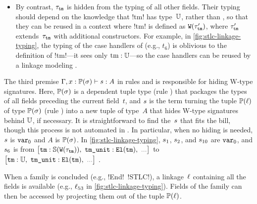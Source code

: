 \begin{itemize}
\item
By contrast, $\tau_{\texttt{tm}}$ is hidden from the typing of all other fields.
Their typing should depend on the knowledge that \lsti!tm! has type~$\mathbb{U}$,
rather than ,
so that they can be reused in a context where
\lsti!tm! is defined as $\texttt{W}({\tau'_{\texttt{tm}}})$,
where $\tau'_{\texttt{tm}}$ extends~$\tau_{\texttt{tm}}$ with additional constructors.
%
For example, in \cref{fig:stlc-linkage-typing}, the typing of the case handlers of
 (e.g., $t_6$) is oblivious to the definition of \lsti!tm!---it sees only $\text{\lsti!tm!}:\cU$---so
the case handlers can be reused by a linkage modeling .

\end{itemize}

The third premise
$ {\Gamma,x : \mathbb{P}({\sigma})} \vdash {\ensuremath{s}} : {A} $
in rules  and  is
responsible for hiding W-type signatures.
Here, $\mathbb{P}({\sigma})$ is a dependent tuple type (rule )
that packages the types of all fields preceding the current field~$t$,
and $s$ is the term turning the tuple $\mathbb{P}({\ell})$ of type
$\mathbb{P}({\sigma})$ (rule ) into a new tuple of type~$A$
that hides W-type signatures behind $\mathbb{U}$, if necessary.
%
It is straightforward to find the~$s$ that fits the bill, though this process
is not automated in \TT.
In particular, when no hiding is needed, $s$ is $\texttt{var}_{0}$
and $A$ is $\mathbb{P}({\sigma})$.
In \cref{fig:stlc-linkage-typing}, $s_1$, $s_2$, and $s_{10}$ are $\texttt{var}_{0}$,
and $s_6$ is from
\begingroup
\fontsize{9}{9}\selectfont%
$\big[\texttt{tm} : \TyS{\wcode{\wsig_{\texttt{tm}}}},\ \texttt{tm\_unit} : \El{\texttt{tm}},\ \dadada\big]$
\endgroup
to
\begingroup
\fontsize{9}{9}\selectfont%
$\big[\texttt{tm} : \cU,\ \texttt{tm\_unit} : \El{\texttt{tm}},\ \dadada\big]$%
\endgroup
.

When a family is concluded (e.g., \lsti!End!~\lsti!STLC!),
a linkage~$\ell$ containing all the fields is available
(e.g., $\ell_{53}$ in \cref{fig:stlc-linkage-typing}).
Fields of the family can then be accessed by projecting them out of the tuple
$\mathbb{P}({\ell})$.


